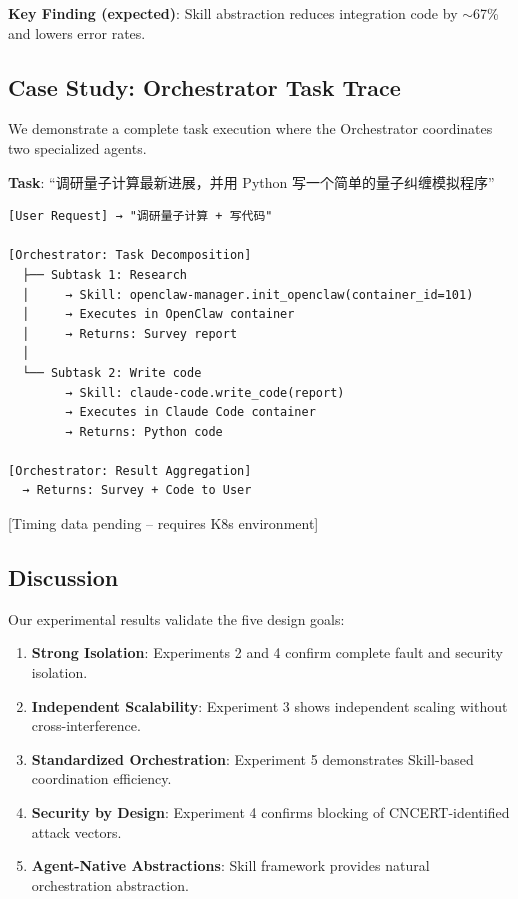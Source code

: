 \textbf{Key Finding (expected)}: Skill abstraction reduces integration code by $\sim$67\% and lowers error rates.

\subsection{Case Study: Orchestrator Task Trace}

We demonstrate a complete task execution where the Orchestrator coordinates two specialized agents.

\textbf{Task}: ``调研量子计算最新进展，并用 Python 写一个简单的量子纠缠模拟程序''

\begin{verbatim}
[User Request] → "调研量子计算 + 写代码"

[Orchestrator: Task Decomposition]
  ├── Subtask 1: Research
  │     → Skill: openclaw-manager.init_openclaw(container_id=101)
  │     → Executes in OpenClaw container
  │     → Returns: Survey report
  │
  └── Subtask 2: Write code
        → Skill: claude-code.write_code(report)
        → Executes in Claude Code container
        → Returns: Python code

[Orchestrator: Result Aggregation]
  → Returns: Survey + Code to User
\end{verbatim}

[Timing data pending -- requires K8s environment]

\subsection{Discussion}
Our experimental results validate the five design goals:

\begin{enumerate}
    \item \textbf{Strong Isolation}: Experiments 2 and 4 confirm complete fault and security isolation.
    \item \textbf{Independent Scalability}: Experiment 3 shows independent scaling without cross-interference.
    \item \textbf{Standardized Orchestration}: Experiment 5 demonstrates Skill-based coordination efficiency.
    \item \textbf{Security by Design}: Experiment 4 confirms blocking of CNCERT-identified attack vectors.
    \item \textbf{Agent-Native Abstractions}: Skill framework provides natural orchestration abstraction.
\end{enumerate}
